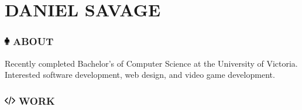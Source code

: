\documentclass[10pt]{tccv}
\begin{document}
\part{DANIEL SAVAGE}

\flafamily

\section{\textcolor{black}{\includegraphics[height=10pt, keepaspectratio=true]{male}} ABOUT}

Recently completed Bachelor's of Computer Science at the University of Victoria. Interested software development, web design, and video game development.

\section{\includegraphics[height=10pt, keepaspectratio=true]{code} WORK}
\end{document}
